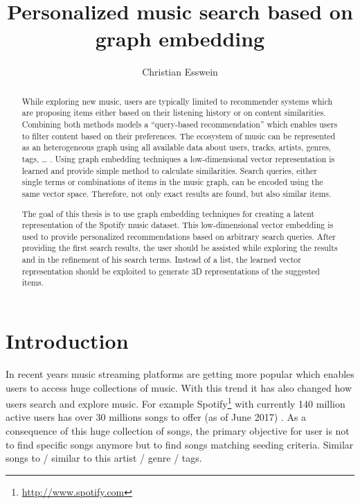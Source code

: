 \documentclass[a4paper]{llncs}
\title{Personalized music search based on graph embedding}
\author{Christian Esswein}
\institute{christian.esswein@student.uibk.ac.at}
\begin{document}
	
	\maketitle
	
	\begin{abstract}
		While exploring new music, users are typically limited to recommender systems which are proposing items either based on their listening history or on content similarities. Combining both methods models a “query-based recommendation” which enables users to filter content based on their preferences.
		The ecosystem of music can be represented as an heterogeneous graph using all available data about users, tracks, artists, genres, tags, … . Using graph embedding techniques a low-dimensional vector representation is learned and provide simple method to calculate similarities. Search queries, either single terms or combinations of items in the music graph, can be encoded using the same vector space. Therefore, not only exact results are found, but also similar items.
		
		
		The goal of this thesis is to use graph embedding techniques for creating a latent representation of the Spotify music dataset. This low-dimensional vector embedding is used to provide personalized recommendations based on arbitrary search queries. After providing the first search results, the user should be assisted while exploring the results and in the refinement of his search terms. Instead of a list, the learned vector representation should be exploited to generate 3D representations of the suggested items.
		
		
	\end{abstract}
	
	\section{Introduction}
	In recent years music streaming platforms are getting more popular which enables users to access huge collections of music. With this trend it has also changed how users search and explore music\cite{lee2016look}. For example Spotify\footnote{\url{http://www.spotify.com}} with currently 140 million active users has over 30 millions songs to offer (as of June 2017)	\cite{aboutSpotify}. As a consequence of this huge collection of songs, the primary objective for user is not to find specific songs anymore but to find songs matching seeding criteria. Similar songs to / similar to this artist / genre / tags.
	
\end{document}
